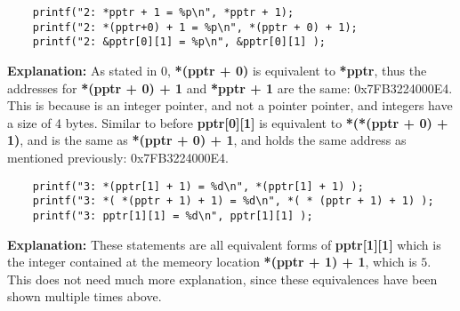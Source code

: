 \documentclass{article}
\begin{document}
\begin{lstlisting}
    printf("2: *pptr + 1 = %p\n", *pptr + 1);
    printf("2: *(pptr+0) + 1 = %p\n", *(pptr + 0) + 1);
    printf("2: &pptr[0][1] = %p\n", &pptr[0][1] );  
\end{lstlisting}
\textbf{Explanation: } As stated in 0, \textbf{*(pptr + 0)} is equivalent to \textbf{*pptr}, thus the addresses for \textbf{*(pptr + 0) + 1} and \textbf{*pptr + 1} are the same: 0x7FB3224000E4. This is because  is an integer pointer, and not a pointer pointer, and integers have a size of 4 bytes. Similar to before \textbf{pptr[0][1]} is equivalent to \textbf{*(*(pptr + 0) + 1)}, and  is the same as \textbf{*(pptr + 0) + 1}, and holds the same address as mentioned previously: 0x7FB3224000E4.
\begin{lstlisting}
    printf("3: *(pptr[1] + 1) = %d\n", *(pptr[1] + 1) );
    printf("3: *( *(pptr + 1) + 1) = %d\n", *( * (pptr + 1) + 1) );
    printf("3: pptr[1][1] = %d\n", pptr[1][1] );
\end{lstlisting}
\textbf{Explanation: }These statements are all equivalent forms of \textbf{pptr[1][1]} which is the integer contained at the memeory location \textbf{*(pptr + 1) + 1}, which is $5$. This does not need much more explanation, since these equivalences have been shown multiple times above.
\end{document}
